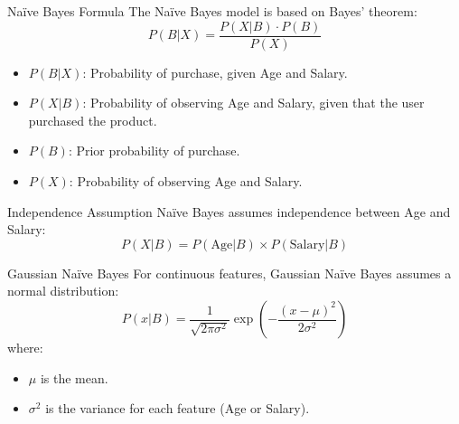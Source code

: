 \begin{frame}{Naïve Bayes Formula}
	The Naïve Bayes model is based on Bayes’ theorem:
	\[
	P(B|X) = \frac{P(X|B) \cdot P(B)}{P(X)}
	\]
	\begin{itemize}
		\item \(P(B|X)\): Probability of purchase, given Age and Salary.
		\item \(P(X|B)\): Probability of observing Age and Salary, given that the user purchased the product.
		\item \(P(B)\): Prior probability of purchase.
		\item \(P(X)\): Probability of observing Age and Salary.
	\end{itemize}
\end{frame}

\begin{frame}{Independence Assumption}
	Naïve Bayes assumes independence between Age and Salary:
	\[
	P(X|B) = P(\text{Age}|B) \times P(\text{Salary}|B)
	\]
\end{frame}

\begin{frame}{Gaussian Naïve Bayes}
	For continuous features, Gaussian Naïve Bayes assumes a normal distribution:
	\[
	P(x|B) = \frac{1}{\sqrt{2\pi \sigma^2}} \exp \left( -\frac{(x - \mu)^2}{2 \sigma^2} \right)
	\]
	where:
	\begin{itemize}
		\item \(\mu\) is the mean.
		\item \(\sigma^2\) is the variance for each feature (Age or Salary).
	\end{itemize}
\end{frame}


